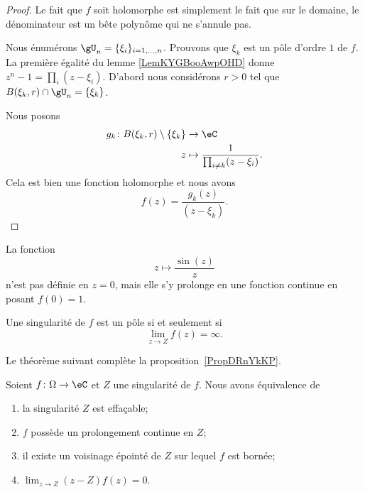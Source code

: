 \begin{proof}
    Le fait que \( f\) soit holomorphe est simplement le fait que sur le domaine, le dénominateur est un bête polynôme qui ne s'annule pas. 

    Nous énumérons \( \gU_n = \{ \xi_i \}_{i=1,\ldots, n}\). Prouvons que \( \xi_k\) est un pôle d'ordre \( 1\) de \( f\). La première égalité du lemme \ref{LemKYGBooAwpOHD} donne \( z^n-1=\prod_i(z-\xi_i)\). D'abord nous considérons \( r>0\) tel que \( B(\xi_k,r)\cap \gU_n=\{ \xi_k \}\).

    Nous posons
    \begin{equation}
        \begin{aligned}
            g_k\colon B(\xi_k,r)\setminus\{ \xi_k \}&\to \eC \\
            z&\mapsto \frac{1}{ \prod_{i\neq k}(z-\xi_i) }. 
        \end{aligned}
    \end{equation}
    Cela est bien une fonction holomorphe et nous avons 
    \begin{equation}
        f(z)=\frac{ g_k(z) }{ (z-\xi_k) }.
    \end{equation}
\end{proof}

\begin{example}
    La fonction
    \begin{equation}
        z\mapsto \frac{ \sin(z) }{ z }
    \end{equation}
    n'est pas définie en \( z=0\), mais elle s'y prolonge en une fonction continue en posant \( f(0)=1\).
\end{example}

\begin{proposition}
    Une singularité de \( f\) est un pôle si et seulement si
    \begin{equation}
        \lim_{z\to Z}f(z)=\infty.
    \end{equation}
\end{proposition}

Le théorème suivant complète la proposition~\ref{PropDRnYkKP}.
\begin{theorem}    \label{ThoTLQOEwW}
    Soient \( f\colon \Omega\to \eC\) et \( Z\) une singularité de \( f\). Nous avons équivalence de
    \begin{enumerate}
        \item
            la singularité \( Z\) est effaçable;
        \item
            \( f\) possède un prolongement continue en \( Z\);
        \item
            il existe un voisinage épointé de \( Z\) sur lequel \( f\) est bornée;
        \item
            \( \lim_{z\to Z}(z-Z)f(z)=0\).
    \end{enumerate}
\end{theorem}

